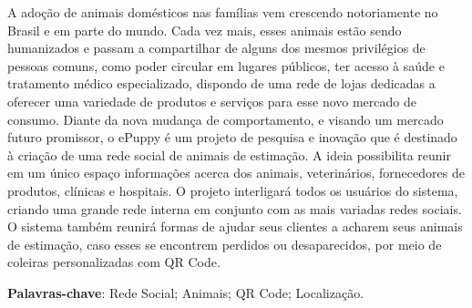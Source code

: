 \begin{resumo}
\noindent
A adoção de animais domésticos nas famílias vem crescendo notoriamente no Brasil e em parte do mundo. Cada vez mais, esses animais estão sendo humanizados e passam a compartilhar de alguns dos mesmos privilégios de pessoas comuns, como poder circular em lugares públicos, ter acesso à saúde e tratamento médico especializado, dispondo de uma rede de lojas dedicadas a oferecer uma variedade de produtos e serviços para esse novo mercado de consumo. Diante da nova mudança de comportamento, e visando um mercado futuro promissor, o ePuppy é um projeto de pesquisa e inovação que é destinado à criação de uma rede social de animais de estimação. A ideia possibilita reunir em um único espaço informações acerca dos animais, veterinários, fornecedores de produtos, clínicas e hospitais. O projeto interligará todos os usuários do sistema, criando uma grande rede interna em conjunto com  as mais variadas redes sociais. O sistema também reunirá formas de ajudar seus clientes a acharem seus animais de estimação, caso esses se encontrem perdidos ou desaparecidos, por meio de coleiras personalizadas com QR Code. 

\noindent
\textbf{Palavras-chave}: Rede Social; Animais; QR Code; Localização.
\end{resumo}
